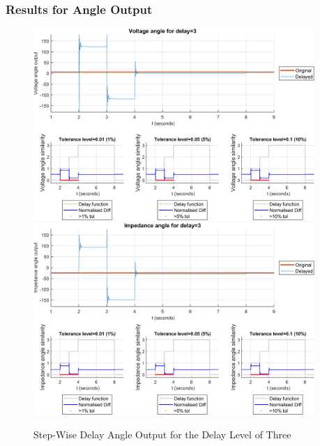 \subsubsection{Results for Angle Output}


\begin{figure}
    \caption{Step-Wise Delay Angle Output for the Delay Level of Three}
    \includegraphics[width=0.95\textwidth]{PMUsim-figures/DelayOf_3/Step_vAngle.png}    
    \includegraphics[width=0.95\textwidth]{PMUsim-figures/DelayOf_3/Step_iAngle.png}    
    \label{fig:PMUsimStep_Three_Angle}
        \begin{small}
     \end{small}
\end{figure}
